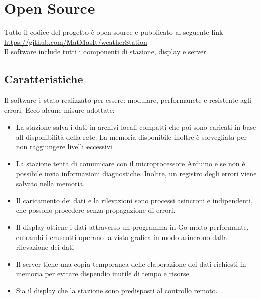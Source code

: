 \documentclass{article}
\begin{document}
\section{Open Source}
Tutto il codice del progetto è open source e pubblicato al seguente link\\
\url{https://github.com/MatMasIt/weatherStation}\\
Il software include tutti i componenti di stazione, display e server.
\subsection{Caratteristiche}
Il software è stato realizzato per essere: modulare, performanete e resistente agli errori.
Ecco alcune misure adottate:
\begin{itemize}
\item La stazione salva i dati in archivi locali compatti che poi sono caricati in base all disponibilità della rete. La memoria disponibile inoltre è sorvegliata per non raggiungere livelli eccessivi
\item La stazione tenta di comunicare con il microprocessore Arduino e se non è possibile invia informazioni diagnostiche. Inoltre, un registro degli errori viene salvato nella memoria.\\
\item Il caricamento dei dati e la rilevazioni sono processi asincroni e indipendenti, che possono procedere senza propagazione di errori.\\
\item Il display ottiene i dati attraverso un programma in Go molto performante, entrambi i cruscotti operano la vista grafica in modo asincrono dalla rilevazione dei dati\\
\item Il server tiene una copia temporanea delle elaborazione dei dati richiesti in memoria per evitare dispendio inutile di tempo e risorse. \\
\item Sia il display che la stazione sono predisposti al controllo remoto.
\end{itemize}
\pagebreak
\renewcommand{\abstractname}{Riconoscimenti}
\end{document}
